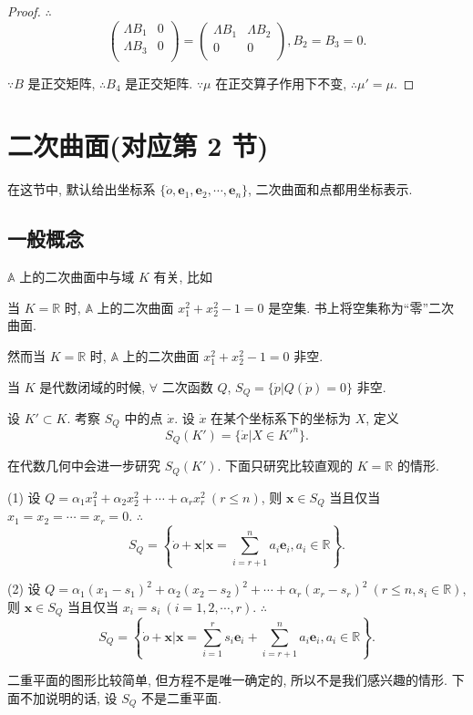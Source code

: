 \documentclass[color=black,device=normal,lang=cn,mode=geye]{elegantnote}
\begin{document}
\begin{proof}
    $\therefore$
    \[\begin{pmatrix}
        \Lambda B_1 & 0 \\
        \Lambda B_3 & 0 \\
    \end{pmatrix}=\begin{pmatrix}
        \Lambda B_1 & \Lambda B_2 \\
        0 & 0 \\
    \end{pmatrix}, B_2=B_3=0.\]

    $\because B$ 是正交矩阵, $\therefore B_4$ 是正交矩阵. $\because\mu$ 在正交算子作用下不变, $\therefore\mu'=\mu$.
\end{proof}
\section{二次曲面(对应第 2 节)}
在这节中, 默认给出坐标系 $\{\dot{o},\boldsymbol{e}_1,\boldsymbol{e}_2,\cdots,\boldsymbol{e}_n\}$, 二次曲面和点都用坐标表示.
\subsection{一般概念}
$\mathbb{A}$ 上的二次曲面中与域 $K$ 有关, 比如
\begin{example}
    当 $K=\mathbb{R}$ 时, $\mathbb{A}$ 上的二次曲面 $x_1^2+x_2^2-1=0$ 是空集. 书上将空集称为``零''二次曲面.

    然而当 $K=\mathbb{R}$ 时, $\mathbb{A}$ 上的二次曲面 $x_1^2+x_2^2-1=0$ 非空.
\end{example}
当 $K$ 是代数闭域的时候, $\forall$ 二次函数 $Q$, $S_Q=\{\dot{p}|Q(\dot{p})=0\}$ 非空.

设 $K'\subset K$. 考察 $S_Q$ 中的点 $\dot{x}$. 设 $\dot{x}$ 在某个坐标系下的坐标为 $X$, 定义
\[S_Q(K')=\{\dot{x}|X\in K'^n\}.\]

在代数几何中会进一步研究 $S_Q(K')$. 下面只研究比较直观的 $K=\mathbb{R}$ 的情形.
\begin{example}
    (1) 设 $Q=\alpha_1x^2_1+\alpha_2x^2_2+\cdots+\alpha_rx^2_r\ (r\leq n)$, 则 $\boldsymbol{x}\in S_Q$ 当且仅当 $x_1=x_2=\cdots=x_r=0$. $\therefore$
    \[S_Q=\left\{\dot{o}+\boldsymbol{x}\Bigg|\boldsymbol{x}=\sum\limits_{i=r+1}^na_i\boldsymbol{e}_i,a_i\in\mathbb{R}\right\}.\]

    (2) 设 $Q=\alpha_1(x_1-s_1)^2+\alpha_2(x_2-s_2)^2+\cdots+\alpha_r(x_r-s_r)^2\ (r\leq n,s_i\in\mathbb{R})$, 则 $\boldsymbol{x}\in S_Q$ 当且仅当 $x_i=s_i\ (i=1,2,\cdots,r)$. $\therefore$
    \[S_Q=\left\{\dot{o}+\boldsymbol{x}\Bigg|\boldsymbol{x}=\sum\limits_{i=1}^rs_i\boldsymbol{e}_i+\sum\limits_{i=r+1}^na_i\boldsymbol{e}_i,a_i\in\mathbb{R}\right\}.\]
\end{example}
二重平面的图形比较简单, 但方程不是唯一确定的, 所以不是我们感兴趣的情形. 下面不加说明的话, 设 $S_Q$ 不是二重平面.
\end{document}
